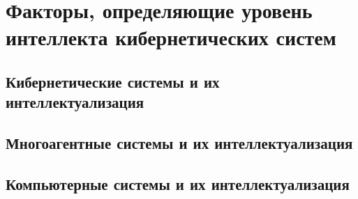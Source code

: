 \chapter{Факторы, определяющие уровень интеллекта кибернетических систем}
\label{chapter_intro}


\section{Кибернетические системы и их интеллектуализация}
\section{Многоагентные системы и их интеллектуализация}
\label{section_mas}

\section{Компьютерные системы и их интеллектуализация}

%